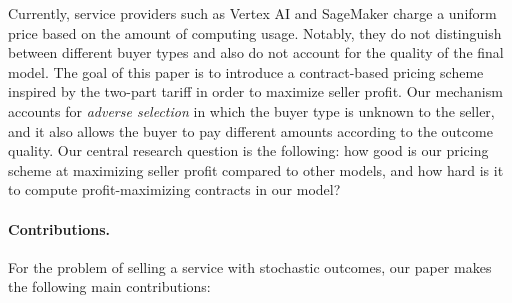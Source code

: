Currently, service providers such as Vertex AI and SageMaker charge a uniform price based on the amount of computing usage. Notably, they do not distinguish between different buyer types and also do not account for the quality of the final model. The goal of this paper is to introduce a contract-based pricing scheme inspired by the two-part tariff in order to maximize seller profit. Our mechanism accounts for \emph{adverse selection} in which the buyer type is unknown to the seller, and it also allows the buyer to pay different amounts according to the outcome quality. Our central research question is the following: how good is our pricing scheme at maximizing seller profit compared to other models, and how hard is it to compute profit-maximizing contracts in our model?

\paragraph{Contributions.} For the problem of selling a service with stochastic outcomes, our paper makes the following main contributions:
